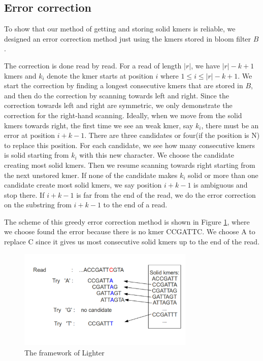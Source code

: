 \documentclass[10pt]{article}
\begin{document}
\subsection*{Error correction}
To show that our method of getting and storing solid kmers is reliable, we designed an error correction method just using the kmers stored in bloom filter $B$.

The correction is done read by read. For a read of length $|r|$, we have $|r|-k+1$ kmers and $k_i$ denote the kmer starts at position $i$ where $1\le i\le|r|-k+1$. We start the correction by finding a longest consecutive kmers that are stored in $B$, and then do the correction by scanning towards left and right. Since the correction towards left and right are symmetric, we only demonstrate the correction for the right-hand scanning. Ideally, when we move from the solid kmers towards right, the first time we see an weak kmer, say $k_i$, there must be an error at position $i+k-1$. There are three candidates or four(if the position is N) to replace this position. For each candidate, we see how many consecutive kmers is solid starting from $k_i$ with this new character. We choose the candidate creating most solid kmers. Then we resume scanning towards right starting from the next unstored kmer. If none of the candidate makes $k_i$ solid or more than one candidate create most solid kmers, we say position $i+k-1$ is ambiguous and stop there. If $i+k-1$ is far from the end of the read, we do the error correction on the substring from $i+k-1$ to the end of a read.

The scheme of this greedy error correction method is shown in Figure \ref{fig:error_correction}, where we choose found the error because there is no kmer CCGATTC. We choose A to replace C since it gives us most consecutive solid kmers up to the end of the read.

\begin{figure}[h!]
\begin{center}
\includegraphics[width=0.75\textwidth]{ErrorCorrection.png}
\caption{The framework of Lighter\label{fig:error_correction}}
\end{center}
\end{figure}
\end{document}

